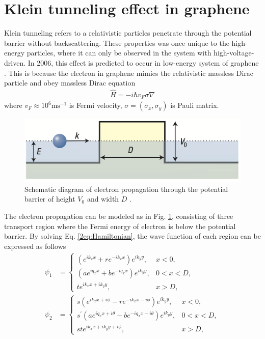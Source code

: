\section{Klein tunneling effect in graphene} \label{2sec:klein effect}
    Klein tunneling refers to a relativistic particles penetrate through the potential barrier without backscattering.
    These properties was once unique to the high-energy particles, where it can only be observed in the system with high-voltage-driven.
    In 2006, this effect is predicted to occur in low-energy system of graphene \cite{Katsnelson2006a}.
    This is because the electron in graphene mimics the relativistic massless Dirac particle and obey massless Dirac equation
    \begin{align} \label{2eq:Hamiltonian}
        \hat{H} = -i\hbar v_F \sigma \nabla 
    \end{align}
    where $v_F \approx 10^6 \mathrm{ms^{-1}}$ is Fermi velocity, $\sigma = (\sigma_x, \sigma_y)$ is Pauli matrix. 
    \begin{figure}[H]
        \centering
        \includegraphics[width=0.7\linewidth]{fig/Chap 2/electron propagation.png}
        \caption{Schematic diagram of electron propagation through the potential barrier of height $V_0$ and width $D$ \cite{Katsnelson2006a}.}
        \label{2fig:electron propagation}
    \end{figure}
    The electron propagation can be modeled as in Fig. \ref{2fig:electron propagation}, consisting of three transport region where the Fermi energy of electron is below the potential barrier.
    By solving Eq. \ref{2eq:Hamiltonian}, the wave function of each region can be expressed as follows
    \begin{equation} \label{2eq:wave function}
        \begin{aligned}
            \psi_1 &= \begin{cases} (e^{ik_x x}+re^{-ik_x x})e^{ik_y y}, &x<0,\\
                (ae^{i q_x x}+be^{-i q_x x})e^{ik_y y},  &0<x<D,\\
                te^{ik_x x + ik_y y},  &x>D,
                \end{cases}\\
            \psi_2 &= \begin{cases} s(e^{ik_x x+i \phi}-re^{-ik_x x-i \phi})e^{ik_y y},  &x<0,\\
                s^\prime(ae^{i q_x x+ i \theta}-be^{-i q_x x- i \theta})e^{ik_y y}, &0<x<D,\\
                ste^{ik_x x + ik_y y+ i \phi}, &x>D,
                \end{cases}
        \end{aligned}
    \end{equation}
